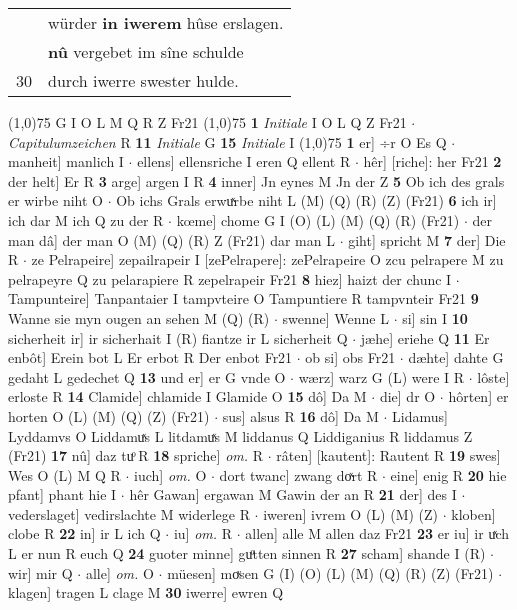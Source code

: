 \documentclass[8pt,a4paper,notitlepage]{article}
\begin{document}
\begin{table}[ht]
\begin{minipage}[t]{0.5\linewidth}
\begin{tabular}{rl}
 & würder \textbf{in iwerem} hûse erslagen.\\ 
 & \textbf{nû} vergebet im sîne schulde\\ 
30 & durch iwerre swester hulde.\\ 
\end{tabular}
\scriptsize
\line(1,0){75} \newline
G I O L M Q R Z Fr21 \newline
\line(1,0){75} \newline
\textbf{1} \textit{Initiale} I O L Q Z Fr21   $\cdot$ \textit{Capitulumzeichen} R  \textbf{11} \textit{Initiale} G  \textbf{15} \textit{Initiale} I  \newline
\line(1,0){75} \newline
\textbf{1} er] ÷r O Es Q  $\cdot$ manheit] manlich I  $\cdot$ ellens] ellensriche I eren Q ellent R  $\cdot$ hêr] [riche]: her Fr21 \textbf{2} der helt] Er R \textbf{3} arge] argen I R \textbf{4} inner] Jn eynes M Jn der Z \textbf{5} Ob ich des grals er wirbe niht O  $\cdot$ Ob ichs Grals erwuͯrbe niht L (M) (Q) (R) (Z) (Fr21) \textbf{6} ich ir] ich dar M ich Q zu der R  $\cdot$ kœme] chome G I (O) (L) (M) (Q) (R) (Fr21)  $\cdot$ der man dâ] der man O (M) (Q) (R) Z (Fr21) dar man L  $\cdot$ giht] spricht M \textbf{7} der] Die R  $\cdot$ ze Pelrapeire] zepailrapeir I [zePelrapere]: zePelrapeire O zcu pelrapere M zu pelrapeyre Q zu pelarapiere R zepelrapeir Fr21 \textbf{8} hiez] haizt der chunc I  $\cdot$ Tampunteire] Tanpantaier I tampvteire O Tampuntiere R tampvnteir Fr21 \textbf{9} Wanne sie myn ougen an sehen M (Q) (R)  $\cdot$ swenne] Wenne L  $\cdot$ si] sin I \textbf{10} sicherheit ir] ir sicherhait I (R) fiantze ir L sicherheit Q  $\cdot$ jæhe] eriehe Q \textbf{11} Er enbôt] Erein bot L Er erbot R Der enbot Fr21  $\cdot$ ob si] obs Fr21  $\cdot$ dæhte] dahte G gedaht L gedechet Q \textbf{13} und er] er G vnde O  $\cdot$ wærz] warz G (L) were I R  $\cdot$ lôste] erloste R \textbf{14} Clamide] chlamide I Glamide O \textbf{15} dô] Da M  $\cdot$ die] dr O  $\cdot$ hôrten] er horten O (L) (M) (Q) (Z) (Fr21)  $\cdot$ sus] alsus R \textbf{16} dô] Da M  $\cdot$ Lidamus] Lyddamvs O Liddamuͯs L litdamuͯs M liddanus Q Liddiganius R liddamus Z (Fr21) \textbf{17} nû] daz tuͦ R \textbf{18} spriche] \textit{om.} R  $\cdot$ râten] [kautent]: Rautent R \textbf{19} swes] Wes O (L) M Q R  $\cdot$ iuch] \textit{om.} O  $\cdot$ dort twanc] zwang doͯrt R  $\cdot$ eine] enig R \textbf{20} hie pfant] phant hie I  $\cdot$ hêr Gawan] ergawan M Gawin der an R \textbf{21} der] des I  $\cdot$ vederslaget] vedirslachte M widerlege R  $\cdot$ iweren] ivrem O (L) (M) (Z)  $\cdot$ kloben] clobe R \textbf{22} in] ir L ich Q  $\cdot$ iu] \textit{om.} R  $\cdot$ allen] alle M allen daz Fr21 \textbf{23} er iu] ir uͯch L er nun R euch Q \textbf{24} guoter minne] guͦtten sinnen R \textbf{27} scham] shande I (R)  $\cdot$ wir] mir Q  $\cdot$ alle] \textit{om.} O  $\cdot$ müesen] moͮsen G (I) (O) (L) (M) (Q) (R) (Z) (Fr21)  $\cdot$ klagen] tragen L clage M \textbf{30} iwerre] ewren Q \newline

\end{minipage}
\end{table}
\end{document}
